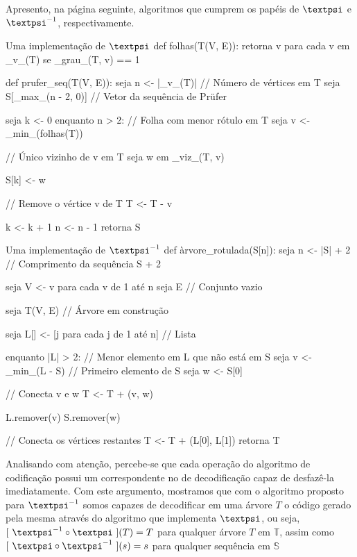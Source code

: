 \documentclass{homework}
\begin{document}
	Apresento, na página seguinte, algoritmos que cumprem os papéis de $\text{\textpsi}$ e $\text{\textpsi}^{-1}$, respectivamente. 
	
	\newpage
	
	\begin{algor}{Uma implementação de $\text{\textpsi}$}
	def folhas(T(V, E)):
		retorna {v para cada v em _v_(T) se _grau_(T, v) == 1}
		
	def prufer_seq(T(V, E)):
		seja n <- |_v_(T)|       // Número de vértices em T
		seja S[_max_(n - 2, 0)] // Vetor da sequência de Prüfer
		
		seja k <- 0
		enquanto n > 2:
			// Folha com menor rótulo em T
			seja v <- _min_(folhas(T))
			
			// Único vizinho de v em T
			seja w em _viz_(T, v)
			
			S[k] <- w
			
			// Remove o vértice v de T
			T <- T - v
			
			k <- k + 1
			n <- n - 1
		retorna S
	\end{algor}

	\begin{algor}{Uma implementação de $\text{\textpsi}^{-1}$}
	def àrvore_rotulada(S[n]):
		seja n <- |S| + 2 // Comprimento da sequência S + 2
		
		seja V{} <- {v para cada v de 1 até n}
		seja E{} // Conjunto vazio
		
		seja T(V, E) // Árvore em construção
		
		seja L[] <- [j para cada j de 1 até n] // Lista
		
		enquanto |L| > 2:
			// Menor elemento em L que não está em S
			seja v <- _min_(L - S)
			// Primeiro elemento de S
			seja w <- S[0]
			
			// Conecta v e w
			T <- T + (v, w)
			
			L.remover(v)
			S.remover(w)
			
		// Conecta os vértices restantes
		T <- T + (L[0], L[1]) 
		retorna T
	\end{algor}

	\newpage
	
	Analisando com atenção, percebe-se que cada operação do algoritmo de codificação possui um correspondente no de decodificação capaz de desfazê-la imediatamente. Com este argumento, mostramos que com o algoritmo proposto para $\text{\textpsi}^{-1}$ somos capazes de decodificar em uma árvore $T$ o código gerado pela mesma através do algoritmo que implementa $\text{\textpsi}$, ou seja, $[~\text{\textpsi}^{-1} \circ \text{\textpsi}~](T) = T$ para qualquer árvore $T$ em $\mathbb{T}$, assim como $[~\text{\textpsi} \circ \text{\textpsi}^{-1}~](s) = s$ para qualquer sequência em $\mathbb{S}$\par
	
\end{document}
